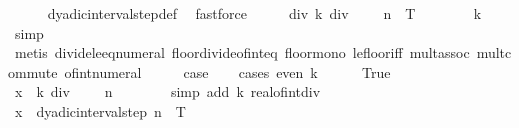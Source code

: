 \begin{isabellebody}
\ \ \ \ \isamarkupfalse%
\ dyadic{\isacharunderscore}{\kern0pt}interval{\isacharunderscore}{\kern0pt}step{\isacharunderscore}{\kern0pt}def\ \isamarkupfalse%
\ fastforce\isanewline
\ \ \isamarkupfalse%
\ \isamarkupfalse%
\ div{}{\isacharcolon}{\kern0pt}\ {\isachardoublequoteopen}k\ div\ {}\ {\isasymin}\ {\isacharbraceleft}{\kern0pt}{}{\isachardot}{\kern0pt}{\isachardot}{\kern0pt}{\isasymlfloor}{}\ {\isacharcircum}{\kern0pt}\ n\ {\isacharasterisk}{\kern0pt}\ T{\isasymrfloor}{\isacharbraceright}{\kern0pt}{\isachardoublequoteclose}\isanewline
\ \ \ \ \ \ \isamarkupfalse%
\ k{\isacharparenleft}{\kern0pt}{}{\isacharparenright}{\kern0pt}\ \isamarkupfalse%
\ simp\isanewline
\ \ \ \ \ \ \isamarkupfalse%
\ {\isacharparenleft}{\kern0pt}metis\ divide{\isacharunderscore}{\kern0pt}le{\isacharunderscore}{\kern0pt}eq{\isacharunderscore}{\kern0pt}numeral{}{\isacharparenleft}{\kern0pt}{}{\isacharparenright}{\kern0pt}\ floor{\isacharunderscore}{\kern0pt}divide{\isacharunderscore}{\kern0pt}of{\isacharunderscore}{\kern0pt}int{\isacharunderscore}{\kern0pt}eq\ floor{\isacharunderscore}{\kern0pt}mono\ le{\isacharunderscore}{\kern0pt}floor{\isacharunderscore}{\kern0pt}iff\ mult{\isachardot}{\kern0pt}assoc\ mult{\isachardot}{\kern0pt}commute\ of{\isacharunderscore}{\kern0pt}int{\isacharunderscore}{\kern0pt}numeral{\isacharparenright}{\kern0pt}\isanewline
\ \ \isamarkupfalse%
\ \isamarkupfalse%
\ {\isacharquery}{\kern0pt}case\isanewline
\ \ \isamarkupfalse%
\ {\isacharparenleft}{\kern0pt}cases\ {\isachardoublequoteopen}even\ k{\isachardoublequoteclose}{\isacharparenright}{\kern0pt}\isanewline
\ \ \ \ \isamarkupfalse%
\ True\isanewline
\ \ \ \ \isamarkupfalse%
\ \isamarkupfalse%
\ {\isachardoublequoteopen}x\ {\isacharequal}{\kern0pt}\ k\ div\ {}\ {\isacharslash}{\kern0pt}\ {}\ {\isacharcircum}{\kern0pt}\ n{\isachardoublequoteclose}\isanewline
\ \ \ \ \ \ \isamarkupfalse%
\ {\isacharparenleft}{\kern0pt}simp\ add{\isacharcolon}{\kern0pt}\ k{\isacharparenleft}{\kern0pt}{}{\isacharparenright}{\kern0pt}\ real{\isacharunderscore}{\kern0pt}of{\isacharunderscore}{\kern0pt}int{\isacharunderscore}{\kern0pt}div{\isacharparenright}{\kern0pt}\isanewline
\ \ \ \ \isamarkupfalse%
\ \isamarkupfalse%
\ {\isachardoublequoteopen}x\ {\isasymin}\ dyadic{\isacharunderscore}{\kern0pt}interval{\isacharunderscore}{\kern0pt}step\ n\ {}\ T{\isachardoublequoteclose}\isanewline

\end{isabellebody}
